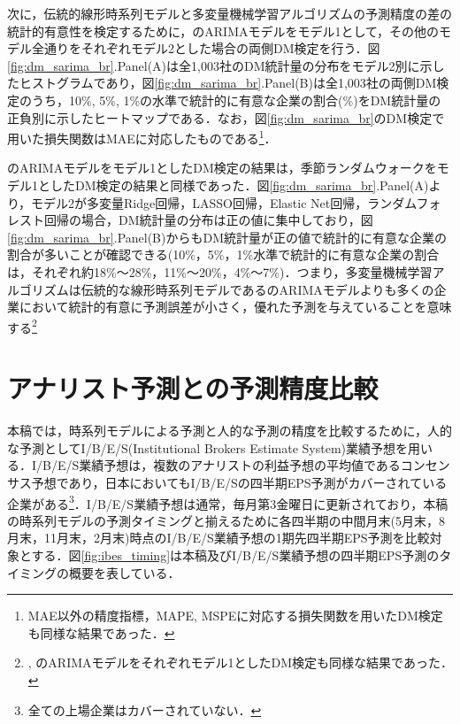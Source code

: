 \documentclass[a4paper，11pt]{jsarticle}
\begin{document}
次に，伝統的線形時系列モデルと多変量機械学習アルゴリズムの予測精度の差の統計的有意性を検定するために，\cite{brown1979univariate}のARIMAモデルをモデル1として，その他のモデル全通りをそれぞれモデル2とした場合の両側DM検定を行う．図\ref{fig:dm_sarima_br}.Panel(A)は全1,003社のDM統計量の分布をモデル2別に示したヒストグラムであり，図\ref{fig:dm_sarima_br}.Panel(B)は全1,003社の両側DM検定のうち，10\%, 5\%, 1\%の水準で統計的に有意な企業の割合(\%)をDM統計量の正負別に示したヒートマップである．なお，図\ref{fig:dm_sarima_br}のDM検定で用いた損失関数はMAEに対応したものである\footnote{MAE以外の精度指標，MAPE, MSPEに対応する損失関数を用いたDM検定も同様な結果であった．}．

\cite{brown1979univariate}のARIMAモデルをモデル1としたDM検定の結果は，季節ランダムウォークをモデル1としたDM検定の結果と同様であった．図\ref{fig:dm_sarima_br}.Panel(A)より，モデル2が多変量Ridge回帰，LASSO回帰，Elastic Net回帰，ランダムフォレスト回帰の場合，DM統計量の分布は正の値に集中しており，図\ref{fig:dm_sarima_br}.Panel(B)からもDM統計量が正の値で統計的に有意な企業の割合が多いことが確認できる(10\%，5\%，1\%水準で統計的に有意な企業の割合は，それぞれ約18\%～28\%，11\%～20\%，4\%～7\%)．つまり，多変量機械学習アルゴリズムは伝統的な線形時系列モデルである\cite{brown1979univariate}のARIMAモデルよりも多くの企業において統計的有意に予測誤差が小さく，優れた予測を与えていることを意味する\footnote{\cite{foster1977quarterly}, \cite{griffin1977time}のARIMAモデルをそれぞれモデル1としたDM検定も同様な結果であった．}

\section{アナリスト予測との予測精度比較}

本稿では，時系列モデルによる予測と人的な予測の精度を比較するために，人的な予測としてI/B/E/S(Institutional Brokers Estimate System)業績予想を用いる．I/B/E/S業績予想は，複数のアナリストの利益予想の平均値であるコンセンサス予想であり，日本においてもI/B/E/Sの四半期EPS予測がカバーされている企業がある\footnote{全ての上場企業はカバーされていない．}．I/B/E/S業績予想は通常，毎月第3金曜日に更新されており，本稿の時系列モデルの予測タイミングと揃えるために各四半期の中間月末(5月末，8月末，11月末，2月末)時点のI/B/E/S業績予想の1期先四半期EPS予測を比較対象とする．図\ref{fig:ibes_timing}は本稿及びI/B/E/S業績予想の四半期EPS予測のタイミングの概要を表している．
\end{document}
